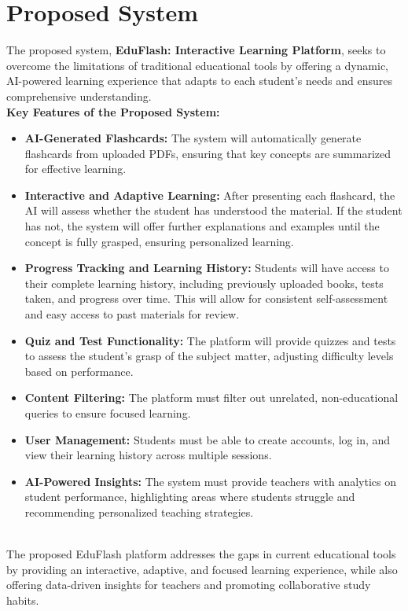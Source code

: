 \documentclass{report}
\begin{document}
\section{Proposed System}
The proposed system, \textbf{EduFlash: Interactive Learning Platform}, seeks to overcome the limitations of traditional educational tools by offering a dynamic, AI-powered learning experience that adapts to each student’s needs and ensures comprehensive understanding.
\\
\textbf{Key Features of the Proposed System:}
\begin{itemize}
    \item \textbf{AI-Generated Flashcards:} The system will automatically generate flashcards from uploaded PDFs, ensuring that key concepts are summarized for effective learning.
    \item \textbf{Interactive and Adaptive Learning:} After presenting each flashcard, the AI will assess whether the student has understood the material. If the student has not, the system will offer further explanations and examples until the concept is fully grasped, ensuring personalized learning.
    \item \textbf{Progress Tracking and Learning History:} Students will have access to their complete learning history, including previously uploaded books, tests taken, and progress over time. This will allow for consistent self-assessment and easy access to past materials for review.
    \item \textbf{Quiz and Test Functionality:} The platform will provide quizzes and tests to assess the student’s grasp of the subject matter, adjusting difficulty levels based on performance.
    \item \textbf{Content Filtering:} The platform must filter out unrelated, non-educational queries to ensure focused learning.
    \item \textbf{User Management:} Students must be able to create accounts, log in, and view their learning history across multiple sessions.
    \item \textbf{AI-Powered Insights:} The system must provide teachers with analytics on student performance, highlighting areas where students struggle and recommending personalized teaching strategies.
\end{itemize}

\\
The proposed EduFlash platform addresses the gaps in current educational tools by providing an interactive, adaptive, and focused learning experience, while also offering data-driven insights for teachers and promoting collaborative study habits.
\end{document}
